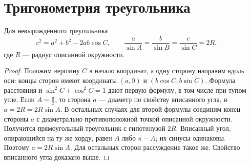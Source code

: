 \section{Тригонометрия треугольника}
\begin{theorem}
Для невырожденного треугольника
\[
c^2=a^2+b^2-2ab\cos C,\qquad
\frac a{\sin A}=\frac b{\sin B}=\frac c{\sin C}=2R,
\]
где \(R\) — радиус описанной окружности.
\end{theorem}
\begin{proof}Положим вершину \(C\) в начало координат, а одну сторону направим вдоль оси: концы сторон имеют координаты \((a,0)\) и \((b\cos C,b\sin C)\). Формула расстояния и \(\sin^2C+\cos^2C=1\) дают первую формулу, в том числе при тупом угле. Если \(A=\frac\pi2\), то сторона \(a\) — диаметр по свойству вписанного угла, и \(a=2R=2R\sin A\). В остальных случаях для второй формулы соединим конец стороны \(a\) с диаметрально противоположной точкой описанной окружности. Получится прямоугольный треугольник с гипотенузой \(2R\). Вписанный угол, опирающийся на ту же хорду, равен \(A\) либо \(\pi-A\); их синусы одинаковы. Поэтому \(a=2R\sin A\). Для остальных сторон рассуждение такое же. Свойство вписанного угла доказано выше.\end{proof}
